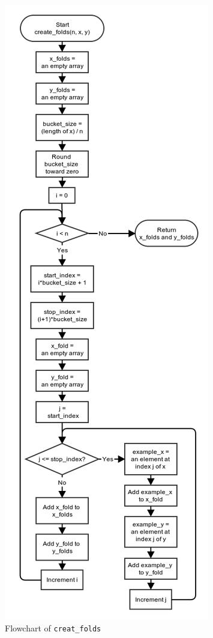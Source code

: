 \documentclass[10pt,a4paper]{article}
\begin{document}
\begin{figure}[!ht]
	\centering
	\includegraphics[scale=0.54]{images/flow_chart/create_folds.png}
	\caption{Flowchart of \tt{creat\_folds}}
	\label{fig:create_folds}
\end{figure}
\end{document}
